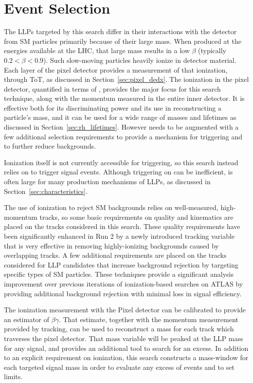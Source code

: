 \chapter{Event Selection}

\label{ch:selection}

The \acp{LLP} targeted by this search differ in their interactions with the detector from \ac{SM} particles primarily because of their large mass. 
When produced at the energies available at the \ac{LHC}, that large mass results in a low $\beta$ (typically $0.2 < \beta < 0.9$). 
Such slow-moving particles heavily ionize in detector material. 
Each layer of the pixel detector provides a measurement of that ionization, through \ac{ToT}, as discussed in Section~\ref{sec:pixel_dedx}. 
The ionization in the pixel detector, quantified in terms of \dedx, provides the major focus for this search technique, along with the momentum measured in the entire inner detector.
It is effective both for its discriminating power and its use in reconstructing a particle's mass, and it can be used for a wide range of masses and lifetimes as discussed in Section~\ref{sec:rh_lifetimes}. 
However \dedx needs to be augmented with a few additional selection requirements to provide a mechanism for triggering and to further reduce backgrounds.

Ionization itself is not currently accessible for triggering, so this search instead relies on \met to trigger signal events.
Although triggering on \met can be inefficient, \met is often large for many production mechanisms of \acp{LLP}, as discussed in Section~\ref{sec:characteristics}.

The use of ionization to reject \ac{SM} backgrounds relies on well-measured, high-momentum tracks, so some basic requirements on quality and kinematics are placed on the tracks considered in this search. 
These quality requirements have been significantly enhanced in Run 2 by a newly introduced tracking variable that is very effective in removing highly-ionizing backgrounds caused by overlapping tracks. 
A few additional requirements are placed on the tracks considered for \ac{LLP} candidates that increase background rejection by targeting specific types of \ac{SM} particles. 
These techniques provide a significant analysis improvement over previous iterations of ionization-based searches on ATLAS by providing additional background rejection with minimal loss in signal efficiency. 

The ionization measurement with the Pixel detector can be calibrated to provide an estimator of $\beta\gamma$. That estimate, together with the momentum measurement provided by tracking, can be used to reconstruct a mass for each track which traverses the pixel detector. 
That mass variable will be peaked at the \ac{LLP} mass for any signal, and provides an additional tool to search for an excess.
In addition to an explicit requirement on ionization, this search constructs a mass-window for each targeted signal mass in order to evaluate any excess of events and to set limits. 

